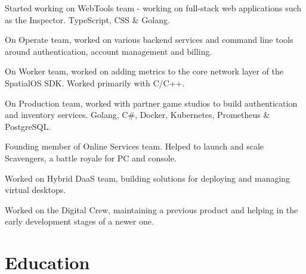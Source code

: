 \documentclass[]{deedy-resume-openfont}
\begin{document}
\begin{minipage}[t]{0.63\textwidth}
\begin{tightemize}
\item Started working on WebTools team - working on full-stack web applications such as the Inspector. TypeScript, CSS \& Golang.
\item On Operate team, worked on various backend services and command line tools around authentication, account management and billing.
\item On Worker team, worked on adding metrics to the core network layer of the SpatialOS SDK. Worked primarily with C/C++.
\item On Production team, worked with partner game studios to build authentication and inventory services. Golang, C\#, Docker, Kubernetes, Prometheus \& PostgreSQL.
\item Founding member of Online Services team. Helped to launch and scale Scavengers, a battle royale for PC and console.
\end{tightemize}
\sectionsep

\begin{tightemize}
\item Worked on Hybrid DaaS team, building solutions for deploying and managing virtual desktops.
\end{tightemize}
\sectionsep

\begin{tightemize}
\item Worked on the Digital Crew, maintaining a previous product and helping in the early development stages of a newer one.
\end{tightemize}
\sectionsep


\section{Education}
\sectionsep{}

\end{minipage} 
\end{document}
